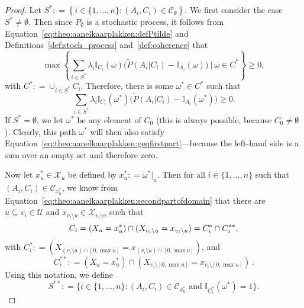 \documentclass[10pt,a4paper]{paper}
\theoremstyle{definition}
\newcommand{\states}{\mathcal{X}}
\newcommand{\ind}[1]{\mathbb{I}_{#1}}
\newcommand{\coloneqq}{:\!=}
\begin{document}
\begin{proof}
Let $S^*\coloneqq\left\{i\in\{1,\dots,n\}\colon(A_i,C_i)\in\mathcal{C}_\emptyset\right\}$. We first consider the case $S^*\neq\emptyset$. Then since $P_\emptyset$ is a stochastic process, it follows from Equation~\eqref{eq:theo:aanelkaarplakken:defPtilde} and Definitions~\ref{def:stoch_process} and~\ref{def:coherence} that
\begin{equation*}%
\max\left\{\sum_{i\in S^*}\lambda_i\ind{C_i}(\omega)\bigl(\tilde{P}(A_i\vert C_i)-\ind{A_i}(\omega)\bigr)~\Bigg\vert~\omega\in C^*\right\}\geq0,
\end{equation*}
with $C^*\coloneqq\cup_{i\in S^*}C_i$. Therefore, there is some $\omega^*\in C^*$ such that
\begin{equation}\label{eq:theo:aanelkaarplakken:geqfirstpart}
\sum_{i\in S^*}\lambda_i\ind{C_i}(\omega^*)\bigl(\tilde{P}(A_i\vert C_i)-\ind{A_i}(\omega^*)\bigr)\geq0.
\end{equation}
If $S^*=\emptyset$, we let $\omega^*$ be any element of $C_0$ (this is always possible, because $C_0\neq\emptyset$). Clearly, this path $\omega^*$ will then also satisfy Equation~\eqref{eq:theo:aanelkaarplakken:geqfirstpart}---because the left-hand side is a sum over an empty set and therefore zero.


Now let $x_u^*\in\states_u$ be defined by $x_u^*\coloneqq \omega^*\vert_u$.
Then for all $i\in\{1,\dots,n\}$ such that $(A_i,C_i)\in\mathcal{C}_{x_u^*}$, we know from Equation~\eqref{eq:theo:aanelkaarplakken:secondpartofdomain} that there are $u\subseteq v_i\in\mathcal{U}$ and $x_{v_i\setminus u}\in\states_{v_i\setminus u}$ such that
\begin{equation}\label{eq:theo:aanelkaarplakken:Cisplit}
C_i=(X_u=x_u^*)\cap(X_{v_i\setminus u}=x_{v_i\setminus u})=C_i^*\cap C_i^{**},\vspace{2mm}
\end{equation}
with $C_i^{*}\coloneqq
(X_{(v_i\setminus u)\cap [0,\max u]}=x_{(v_i\setminus u)\cap [0,\max u]})$, and
\begin{equation}\label{eq:theo:aanelkaarplakken:Cistarstar}
C_i^{**}\coloneqq(X_u=x_u^*)\cap(X_{v_i\setminus [0,\max u]}=x_{v_i\setminus [0,\max u]})\,.
\end{equation}
Using this notation, we define
\begin{equation}\label{eq:theo:aanelkaarplakken:Sstarstardef}
S^{**}\coloneqq
\{
i\in\{1,\dots,n\}
\colon
(A_i,C_i)\in\mathcal{C}_{x_u^*}
\text{~and~}
\ind{C_i^*}(\omega^*)=1
\}.
\end{equation}



\end{proof}
\end{document}

